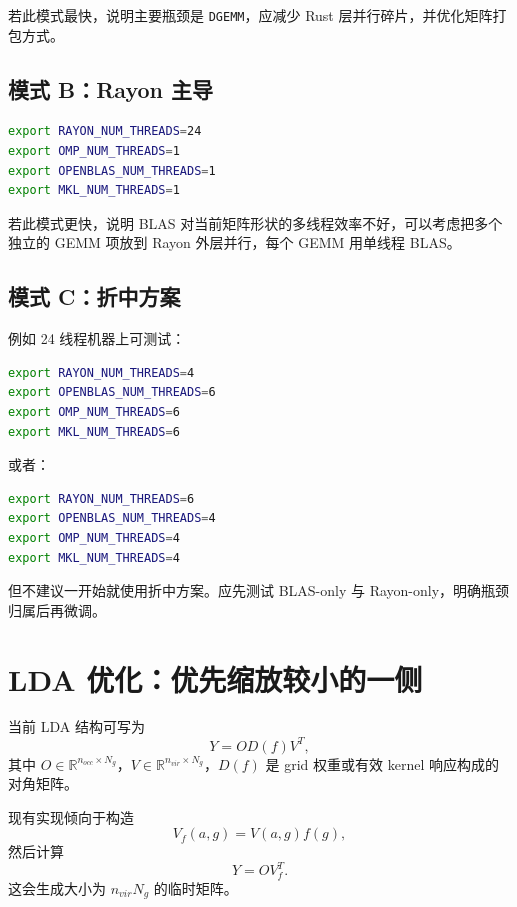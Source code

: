 \documentclass[11pt,a4paper]{ctexart}
\begin{document}
若此模式最快，说明主要瓶颈是 \texttt{DGEMM}，应减少 Rust 层并行碎片，并优化矩阵打包方式。

\subsection{模式 B：Rayon 主导}

\begin{lstlisting}[language=bash,style=code]
export RAYON_NUM_THREADS=24
export OMP_NUM_THREADS=1
export OPENBLAS_NUM_THREADS=1
export MKL_NUM_THREADS=1
\end{lstlisting}

若此模式更快，说明 BLAS 对当前矩阵形状的多线程效率不好，可以考虑把多个独立的 GEMM 项放到 Rayon 外层并行，每个 GEMM 用单线程 BLAS。

\subsection{模式 C：折中方案}

例如 24 线程机器上可测试：

\begin{lstlisting}[language=bash,style=code]
export RAYON_NUM_THREADS=4
export OPENBLAS_NUM_THREADS=6
export OMP_NUM_THREADS=6
export MKL_NUM_THREADS=6
\end{lstlisting}

或者：

\begin{lstlisting}[language=bash,style=code]
export RAYON_NUM_THREADS=6
export OPENBLAS_NUM_THREADS=4
export OMP_NUM_THREADS=4
export MKL_NUM_THREADS=4
\end{lstlisting}

但不建议一开始就使用折中方案。应先测试 BLAS-only 与 Rayon-only，明确瓶颈归属后再微调。

\section{LDA 优化：优先缩放较小的一侧}

当前 LDA 结构可写为
\begin{equation}
  Y = O D(f) V^T,
\end{equation}
其中 $O\in\mathbb{R}^{n_{occ}\times N_g}$，$V\in\mathbb{R}^{n_{vir}\times N_g}$，$D(f)$ 是 grid 权重或有效 kernel 响应构成的对角矩阵。

现有实现倾向于构造
\begin{equation}
  V_f(a,g)=V(a,g)f(g),
\end{equation}
然后计算
\begin{equation}
  Y = O V_f^T.
\end{equation}
这会生成大小为 $n_{vir}N_g$ 的临时矩阵。
\end{document}
